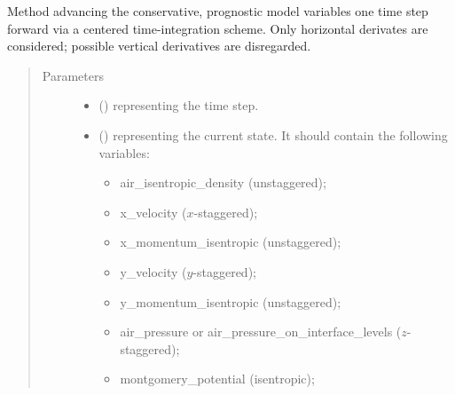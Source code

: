 \documentclass[letterpaper,10pt,english]{sphinxmanual}
\begin{document}
\begin{fulllineitems}
\begin{fulllineitems}
\end{fulllineitems}


\begin{fulllineitems}
\label{\detokenize{api:dycore.prognostic_isentropic_centered.PrognosticIsentropicCentered.step_neglecting_vertical_advection}}
Method advancing the conservative, prognostic model variables one time step forward via a
centered time-integration scheme. Only horizontal derivates are considered; possible vertical
derivatives are disregarded.
\begin{quote}\begin{description}
\item[{Parameters}] \leavevmode\begin{itemize}
\item {} 
 () \textendash{}  representing the time step.

\item {} 
 () \textendash{} 
{\hyperref[\detokenize{api:storages.state_isentropic.StateIsentropic}]{}} representing the current state.
It should contain the following variables:
\begin{itemize}
\item {} 
air\_isentropic\_density (unstaggered);

\item {} 
x\_velocity (\(x\)-staggered);

\item {} 
x\_momentum\_isentropic (unstaggered);

\item {} 
y\_velocity (\(y\)-staggered);

\item {} 
y\_momentum\_isentropic (unstaggered);

\item {} 
air\_pressure or air\_pressure\_on\_interface\_levels (\(z\)-staggered);

\item {} 
montgomery\_potential (isentropic);


\end{itemize}
\end{itemize}
\end{description}
\end{quote}
\end{fulllineitems}
\end{fulllineitems}
\end{document}

